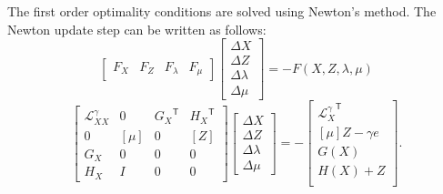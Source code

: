 \documentclass[12pt]{article}
\newcommand{\trans}[1]{{#1}^{\ensuremath{\mathsf{T}}}}  %
\newcommand{\diag}[1]{\left[{#1}\right]}                %
\numberwithin{equation}{section}
\numberwithin{table}{section}
\numberwithin{figure}{section}
\begin{document}
The first order optimality conditions are solved using Newton's method. The Newton update step can be written as follows:
\begin{equation}
\left[\begin{array}{cccc}
F_X & F_Z & F_\lambda & F_\mu
\end{array}\right]
\left[\begin{array}{c}
\Delta X \\
\Delta Z \\
\Delta \lambda \\
\Delta \mu
\end{array}\right]
= -F(X, Z, \lambda, \mu)
\end{equation}
\begin{equation}
\left[\begin{array}{cccc}
\mathcal{L}^\gamma_{XX} & 0 & \trans{G_X} & \trans{H_X} \\
0 & \diag{\mu} & 0 & \diag{Z} \\
G_X & 0 & 0 & 0 \\
H_X & I & 0 & 0
\end{array}\right]
\left[\begin{array}{c}
\Delta X \\
\Delta Z \\
\Delta \lambda \\
\Delta \mu
\end{array}\right]
= -\left[\begin{array}{c}
\trans{\mathcal{L}^\gamma_X} \\
\diag{\mu} Z - \gamma e \\
G(X) \\
H(X) + Z \\
\end{array}\right].
\label{eq:newton_step}
\end{equation}
\end{document}
